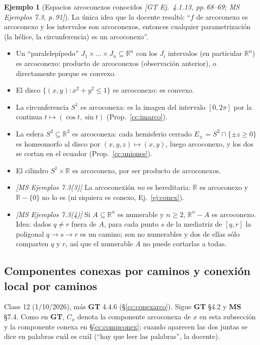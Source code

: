 \documentclass[11pt,a4paper]{article}
\newenvironment{lista}{\leavevmode\begin{itemize}[leftmargin=1.5em,itemsep=1pt,topsep=2pt,parsep=0pt]}{\end{itemize}}
\theoremstyle{definition}
\newtheorem{ejemplo}[definicion]{Ejemplo}
\theoremstyle{plain}
\newcommand{\fnt}[1]{{\normalfont\small\itshape\color{gray!150!black}[#1]}}
\newcommand{\R}{\mathbb{R}}
\begin{document}
\begin{ejemplo}[Espacios arcoconexos conocidos \fnt{GT Ej.\ 4.1.13, pp.\,68--69; MS Ejemplos 7.3, p.\,91}]\label{cc:ejarco}
La única idea que la docente resaltó: ``$f$ de arcoconexo es arcoconexo y los intervalos son arcoconexos, entonces cualquier parametrización (la hélice, la circunferencia) es un arcoconexo''.
\begin{lista}
\item Un ``paralelepípedo'' $J_1\times\dots\times J_n\subseteq\R^n$ con los $J_i$ intervalos (en particular $\R^n$) es arcoconexo: producto de arcoconexos (observación anterior), o directamente porque es convexo.
\item El disco $\{(x,y): x^2+y^2\le1\}$ es arcoconexo: es convexo.
\item La circunferencia $S^1$ es arcoconexa: es la imagen del intervalo $[0,2\pi]$ por la continua $t\mapsto(\cos t,\sin t)$ (Prop.~\ref{cc:imarco}).
\item La esfera $S^2\subseteq\R^3$ es arcoconexa: cada hemisferio cerrado $E_\pm=S^2\cap\{\pm z\ge0\}$ es homeomorfo al disco por $(x,y,z)\mapsto(x,y)$, luego arcoconexo, y los dos se cortan en el ecuador (Prop.~\ref{cc:uniones}).
\item El cilindro $S^1\times\R$ es arcoconexo, por ser producto de arcoconexos.
\item \fnt{MS Ejemplos 7.3(3)} La arcoconexión \emph{no} es hereditaria: $\R$ es arcoconexo y $\R-\{0\}$ no lo es (ni siquiera es conexo, Ej.~\ref{ej:conex}).
\item \fnt{MS Ejemplos 7.3(4)} Si $A\subseteq\R^n$ es numerable y $n\ge2$, $\R^n-A$ es arcoconexo. Idea: dados $q\ne r$ fuera de $A$, para cada punto $s$ de la mediatriz de $[q,r]$ la poligonal $q\to s\to r$ es un camino; son no numerables y dos de ellas sólo comparten $q$ y $r$, así que el numerable $A$ no puede cortarlas a todas.
\end{lista}
\end{ejemplo}

\subsection{Componentes conexas por caminos y conexión local por caminos}\label{cc:compcam}

\noindent Clase 12 (1/10/2026), más \textbf{GT} 4.4.6 (\S\ref{cc:conexarco}). Sigue \textbf{GT} \S4.2 y \textbf{MS} \S7.4. Como en \textbf{GT}, $C_x$ denota la componente arcoconexa de $x$ en esta subsección y la componente conexa en \S\ref{cc:compconex}; cuando aparecen las dos juntas se dice en palabras cuál es cuál (``hay que leer las palabras'', la docente).
\end{document}
